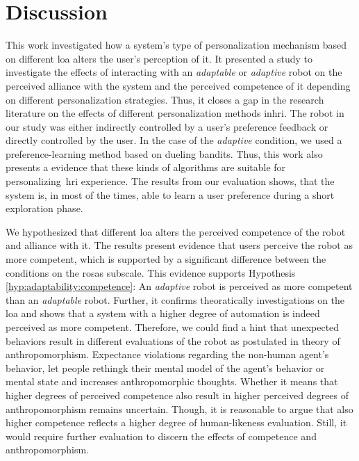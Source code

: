 \documentclass[twocolumn]{svjour3}          %
\begin{document}
\section{Discussion}\label{discussion}
This work investigated how a system's type of personalization mechanism
based on different \gls{loa} alters the user's perception of it. It presented
a study to investigate the effects of interacting with an \textit{adaptable} or
\textit{adaptive} robot on the perceived alliance with the system and
the perceived competence of it depending on different personalization
strategies. Thus, it closes a gap in the research literature on the
effects of different personalization methods in\gls{hri}. The robot in our
study was either indirectly controlled by a user's preference feedback
or directly controlled by the user. In the case of the \textit{adaptive}
condition, we used a preference-learning method based on dueling bandits.
Thus, this work also presents a evidence that these
kinds of algorithms are suitable for personalizing~\gls{hri} experience. The results from our evaluation shows, that the system is, in most of the times, able to learn a user preference during a short exploration phase. 

We hypothesized that different \gls{loa} alters the perceived competence of
the robot and alliance with it. The results present evidence that
users perceive the robot as more competent, which is supported by a
significant difference between the conditions on the \gls{rosas} subscale.
This evidence supports Hypothesis \ref{hyp:adaptability:competence}: An \textit{adaptive}
robot is perceived as more competent than an \textit{adaptable} robot. Further, it confirms theoratically investigations on the \gls{loa} and shows that a system with a higher degree of automation is indeed perceived as more competent. Therefore, we could find a hint that unexpected behaviors result in different evaluations of the robot as postulated in \textcite{epley2007seeing} theory of anthropomorphism. Expectance violations regarding the non-human agent's behavior, let people rethingk their mental model of the agent's behavior or mental state and increases anthropomorphic thoughts. Whether it means that higher degrees of perceived competence also result in higher perceived degrees of anthropomorphism remains uncertain. Though, it is reasonable to argue that also higher competence reflects a higher degree of human-likeness evaluation. Still, it would require further evaluation to discern the effects of competence and anthropomorphism.
\end{document}
